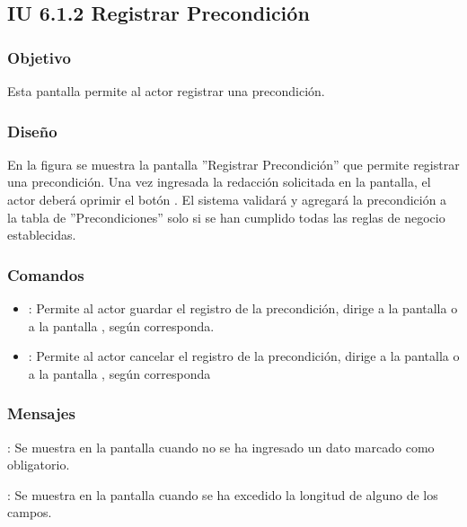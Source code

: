 \subsection{IU 6.1.2 Registrar Precondición}

\subsubsection{Objetivo}
	Esta pantalla permite al actor registrar una precondición.
\subsubsection{Diseño}
	En la figura  se muestra la pantalla ''Registrar Precondición'' que permite registrar una precondición. Una vez ingresada la redacción solicitada en la pantalla, el actor deberá oprimir el botón  . El sistema validará y agregará la precondición a la tabla de ''Precondiciones'' solo si se han cumplido todas las reglas de negocio establecidas.

\subsubsection{Comandos}
\begin{itemize}
	\item {}: Permite al actor guardar el registro de la precondición, dirige a la pantalla  o a la pantalla , según corresponda.
	\item {}: Permite al actor cancelar el registro de la precondición, dirige a la pantalla  o a la pantalla , según corresponda
\end{itemize}

\subsubsection{Mensajes}

\begin{Citemize}
	\item {}: Se muestra en la pantalla  cuando no se ha ingresado un dato marcado como obligatorio.
	\item {}: Se muestra en la pantalla  cuando se ha excedido la longitud de alguno de los campos.
\end{Citemize}
